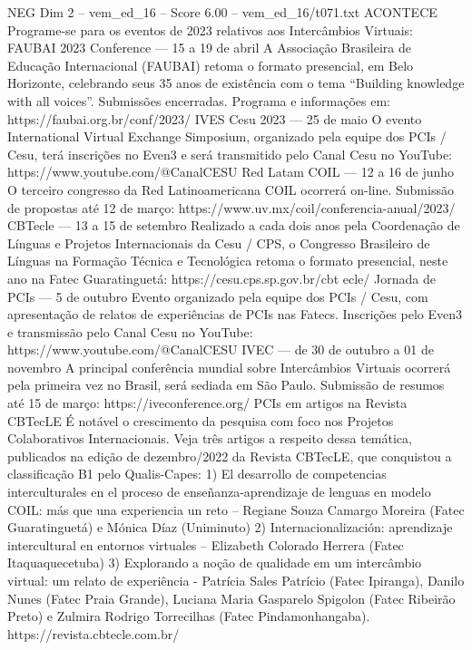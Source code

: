 \begin{textsample}{NEG Dim 2 – vem\_ed\_16 – Score 6.00 – vem\_ed\_16/t071.txt}  \label{ex:f2_neg_104}
ACONTECE Programe-se para os eventos de 2023 relativos aos Intercâmbios Virtuais: FAUBAI 2023 Conference — 15 a 19 de abril A Associação Brasileira de Educação Internacional (FAUBAI) retoma o formato presencial, em Belo Horizonte, celebrando seus 35 anos de existência com o tema “Building knowledge with all voices”.
Submissões encerradas.
Programa e informações em: https://faubai.org.br/conf/2023/ IVES Cesu 2023 — 25 de maio O evento International Virtual Exchange Simposium, organizado pela equipe dos PCIs / Cesu, terá inscrições no Even3 e será transmitido pelo Canal Cesu no YouTube: https://www.youtube.com/@CanalCESU Red Latam COIL — 12 a 16 de junho O terceiro congresso da Red Latinoamericana COIL ocorrerá on-line.
Submissão de propostas até 12 de março: https://www.uv.mx/coil/conferencia-anual/2023/ CBTecle — 13 a 15 de setembro Realizado a cada dois anos pela Coordenação de Línguas e Projetos Internacionais da Cesu / CPS, o Congresso Brasileiro de Línguas na Formação Técnica e Tecnológica retoma o formato presencial, neste ano na Fatec Guaratinguetá: https://cesu.cps.sp.gov.br/cbt ecle/ Jornada de PCIs — 5 de outubro Evento organizado pela equipe dos PCIs / Cesu, com apresentação de relatos de experiências de PCIs nas Fatecs.
Inscrições pelo Even3 e transmissão pelo Canal Cesu no YouTube: https://www.youtube.com/@CanalCESU IVEC — de 30 de outubro a 01 de novembro A principal conferência mundial sobre Intercâmbios Virtuais ocorrerá pela primeira vez no Brasil, será sediada em São Paulo.
Submissão de resumos até 15 de março: https://iveconference.org/ PCIs em artigos na Revista CBTecLE É notável o crescimento da pesquisa com foco nos Projetos Colaborativos Internacionais.
Veja três artigos a respeito dessa temática, publicados na edição de dezembro/2022 da Revista CBTecLE, que conquistou a classificação B1 pelo Qualis-Capes: 1) El desarrollo de competencias interculturales en el proceso de enseñanza-aprendizaje de lenguas en modelo COIL: más que una experiencia un reto – Regiane Souza Camargo Moreira (Fatec Guaratinguetá) e Mónica Díaz (Uniminuto) 2) Internacionalización: aprendizaje intercultural en entornos virtuales – Elizabeth Colorado Herrera (Fatec Itaquaquecetuba) 3) Explorando a noção de qualidade em um intercâmbio virtual: um relato de experiência - Patrícia Sales Patrício (Fatec Ipiranga), Danilo Nunes (Fatec Praia Grande), Luciana Maria Gasparelo Spigolon (Fatec Ribeirão Preto) e Zulmira Rodrigo Torrecilhas (Fatec Pindamonhangaba). https://revista.cbtecle.com.br/

\end{textsample}
